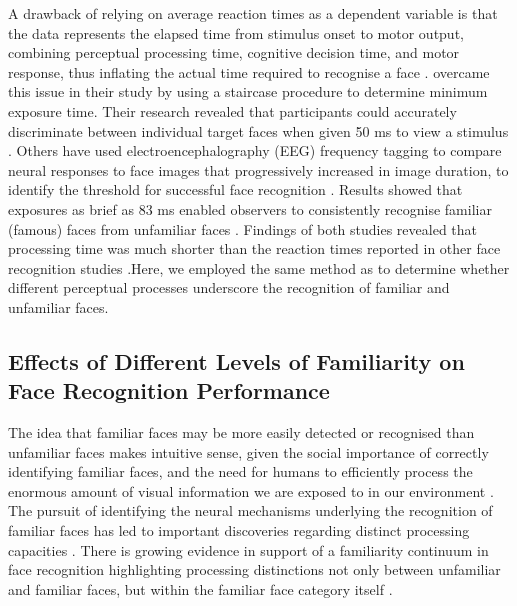 \documentclass[
  authoryear,
  review,
  3p,
  onecolumn]{elsarticle}
\begin{document}
A drawback of relying on average reaction times as a dependent variable
is that the data represents the elapsed time from stimulus onset to
motor output, combining perceptual processing time, cognitive decision
time, and motor response, thus inflating the actual time required to
recognise a face \citep{alzueta2019a, burton2015a, caharel2014a}.
\citet{taubert2011a} overcame this issue in their study by using a
staircase procedure to determine minimum exposure time. Their research
revealed that participants could accurately discriminate between
individual target faces when given 50 ms to view a stimulus
\citep{taubert2011a}. Others have used electroencephalography (EEG)
frequency tagging to compare neural responses to face images that
progressively increased in image duration, to identify the threshold for
successful face recognition \citep{quek2021a, dobs_how_2019}. Results
showed that exposures as brief as 83 ms enabled observers to
consistently recognise familiar (famous) faces from unfamiliar faces
\citep{quek2021a}. Findings of both studies revealed that processing
time was much shorter than the reaction times reported in other face
recognition studies \citep{besson2016a, blauch2021a, oruc2019a}.Here, we
employed the same method as \citet{taubert2011a} to determine whether
different perceptual processes underscore the recognition of familiar
and unfamiliar faces.

\subsection{Effects of Different Levels of Familiarity on Face
Recognition
Performance}\label{effects-of-different-levels-of-familiarity-on-face-recognition-performance}

The idea that familiar faces may be more easily detected or recognised
than unfamiliar faces makes intuitive sense, given the social importance
of correctly identifying familiar faces, and the need for humans to
efficiently process the enormous amount of visual information we are
exposed to in our environment \citep{tong1999a}. The pursuit of
identifying the neural mechanisms underlying the recognition of familiar
faces has led to important discoveries regarding distinct processing
capacities \citep{bortolon2017a, ramon2017a}. There is growing evidence
in support of a familiarity continuum in face recognition highlighting
processing distinctions not only between unfamiliar and familiar faces,
but within the familiar face category itself
\citep{megraya2006a, murphy2015a, quek2021a, wiese2021a}.
\end{document}
